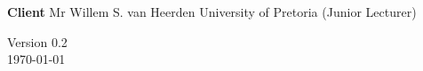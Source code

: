 \begin{titlepage}
\begin{center}
\begin{flushright}
			\textbf{\LARGE Client}\newline 
			Mr Willem S. van Heerden \newline
			University of Pretoria (Junior Lecturer)\newline
			
	\end{flushright}
		
		\vspace{1 cm}
		

		
		\vfill
		
		{\LARGE Version 0.2}
		\\
		{\large \today}		
		
		
	\end{center}
\end{titlepage}

